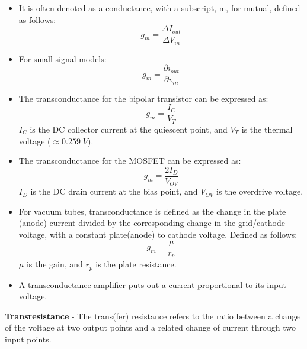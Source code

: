     \vspace{0.15cm}
    \begin{itemize}
        \setlength\itemsep{0.5em}
        \item{It is often denoted as a conductance, with a subscript, m, for mutual, defined as follows:}
            \begin{equation}
                g_m = \frac{\Delta I_{out}}{\Delta V_{in}}
            \end{equation}
        \item{For small signal models:}
            \begin{equation}
                g_m = \frac{\partial i_{out}}{\partial v_{in}}
            \end{equation}
        \item{The transconductance for the bipolar transistor can be expressed as:}
            \begin{equation}
                g_m = \frac{I_C}{V_T}
            \end{equation}
            $I_C$ is the DC collector current at the quiescent point, and $V_T$ is the thermal voltage ($\approx 0.259\;V$).
        \item{The transconductance for the MOSFET can be expressed as:}
            \begin{equation}
                g_m = \frac{2I_D}{V_{OV}}
            \end{equation}
            $I_D$ is the DC drain current at the bias point, and $V_{OV}$ is the overdrive voltage.
        \item{For vacuum tubes, transconductance is defined as the change in the plate (anode) current divided by the corresponding change in the grid/cathode voltage, with a constant plate(anode) to cathode voltage.  Defined as follows:}
            \begin{equation}
                g_m = \frac{\mu}{r_p}
            \end{equation}
            $\mu$ is the gain, and $r_p$ is the plate resistance.
        \item{A transconductance amplifier puts out a current proportional to its input voltage.}
    \end{itemize}
\vspace{0.5cm}
    \textbf{Transresistance} - The trans(fer) resistance refers to the ratio between a change of the voltage at two output points and a related change of current through two input points.
